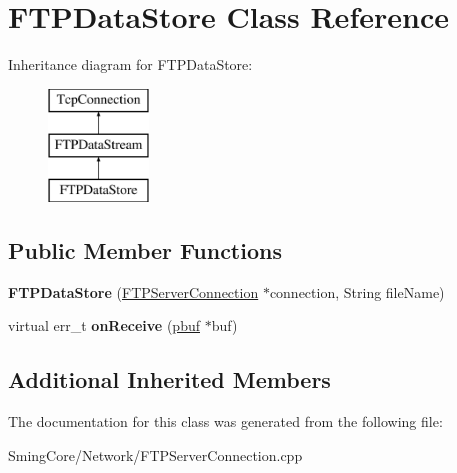 \hypertarget{class_f_t_p_data_store}{}\section{F\+T\+P\+Data\+Store Class Reference}
\label{class_f_t_p_data_store}
Inheritance diagram for F\+T\+P\+Data\+Store\+:\begin{figure}[H]
\begin{center}
\leavevmode
\includegraphics[height=3.000000cm]{class_f_t_p_data_store}
\end{center}
\end{figure}
\subsection*{Public Member Functions}
\begin{DoxyCompactItemize}
\item 
\hypertarget{class_f_t_p_data_store_a17182d9c40530b2a97f08751d8c13a75}{}{\bfseries F\+T\+P\+Data\+Store} (\hyperlink{class_f_t_p_server_connection}{F\+T\+P\+Server\+Connection} $\ast$connection, String file\+Name)\label{class_f_t_p_data_store_a17182d9c40530b2a97f08751d8c13a75}

\item 
\hypertarget{class_f_t_p_data_store_a34b216c8bbde46d3415a82b2dd5b066d}{}virtual err\+\_\+t {\bfseries on\+Receive} (\hyperlink{structpbuf}{pbuf} $\ast$buf)\label{class_f_t_p_data_store_a34b216c8bbde46d3415a82b2dd5b066d}

\end{DoxyCompactItemize}
\subsection*{Additional Inherited Members}


The documentation for this class was generated from the following file\+:\begin{DoxyCompactItemize}
\item 
Sming\+Core/\+Network/F\+T\+P\+Server\+Connection.\+cpp\end{DoxyCompactItemize}
